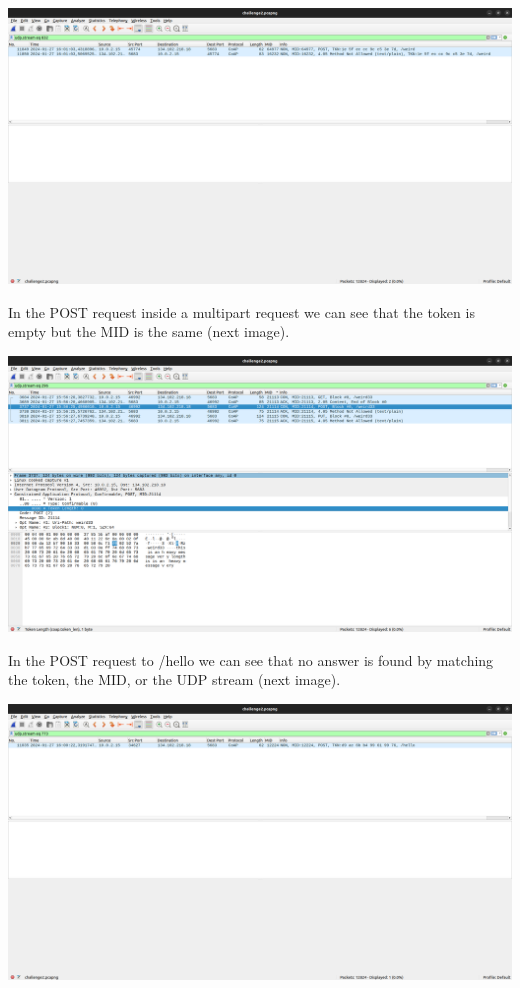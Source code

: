 \documentclass[11pt]{article}
\begin{document}
\includegraphics{2a_1.png}

    In the POST request inside a multipart request we can see that the token
is empty but the MID is the same (next image).

\includegraphics{2a_2.png}

    In the POST request to /hello we can see that no answer is found by
matching the token, the MID, or the UDP stream (next image).

\includegraphics{2a_3.png}
\end{document}
